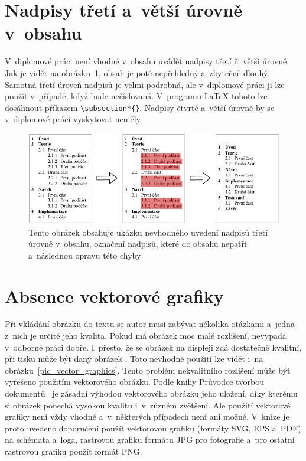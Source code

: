 \section{Nadpisy třetí a~větší úrovně v~obsahu}
V~diplomové práci není vhodné v~obsahu uvádět nadpisy třetí či větší úrovně.
Jak je vidět na obrázku~\ref{pic_heading}, obsah je poté nepřehledný a~zbytečně
dlouhý. Samotná třetí úroveň nadpisů je velmi podrobná, ale v~diplomové práci
ji lze použít v~případě, když bude nečíslovaná. V~programu {\LaTeX} tohoto lze dosáhnout
příkazem \verb|\subsection*{}|. Nadpisy čtvrté a~větší úrovně by se v~diplomové
práci vyskytovat neměly.

\begin{figure}[H]
    \centering
    \includegraphics[width=\linewidth]{obrazky-figures/heading_example.pdf}
    \caption{
        Tento obrázek obsahuje ukázku nevhodného uvedení nadpisů třetí
        úrovně v~obsahu, označení nadpisů, které do obsahu nepatří
        a~následnou opravu této chyby
    }
    \label{pic_heading}
\end{figure}


\section{Absence vektorové grafiky} \label{vector_graphic}
Při vkládání obrázku do textu se autor musí zabývat několika otázkami a~jedna
z~nich je určitě jeho kvalita. Pokud má obrázek moc malé rozlišení,
nevypadá v~odborné práci dobře. I~přesto, že se obrázek na displeji zdá
dostatečně kvalitní, při tisku může být daný obrázek .
Toto nevhodné použití lze vidět i~na obrázku~\ref{pic_vector_graphics}.
Tento problém nekvalitního rozlišení může být vyřešeno použitím vektorového obrázku.
Podle knihy Průvodce tvorbou dokumentů~\cite[k.~10, s.~56--61]{Pruvodce_tvorbou_dokumentu} 
je zásadní výhodou vektorového
obrázku jeho uložení, díky kterému si obrázek ponechá vysokou kvalitu i~v~různém
zvětšení. Ale použití vektorové grafiky není vždy vhodné a~v~některých případech
není ani možné. V~knize je proto uvedeno doporučení použít vektorovou grafiku
(formáty SVG, EPS a~PDF) na schémata a~loga, rastrovou grafiku formátu JPG pro
fotografie a~pro ostatní rastrovou grafiku použít formát PNG.

